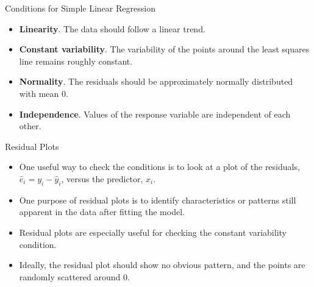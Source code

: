 \documentclass[11pt]{beamer}\usepackage[]{graphicx}\usepackage[]{color}
\begin{document}
\begin{frame}{Conditions for Simple Linear Regression}

\begin{itemize}
\item \textbf{Linearity}.  The data should follow a linear trend.
\vspace{5pt}
\item \textbf{Constant variability}.  The variability of the points around the least squares line remains roughly constant.
\vspace{5pt}
\item \textbf{Normality}.  The residuals should be approximately normally distributed with mean 0.
\vspace{5pt}
\item \textbf{Independence}.  Values of the response variable are independent of each other. 
\end{itemize}
\end{frame}

\begin{frame}{Residual Plots}
\begin{itemize}
\item One useful way to check the conditions is to look at a plot of the residuals, $\hat{e}_i = y_i - \hat{y}_i$, versus the predictor, $x_i$.
\vspace{5pt}
\item One purpose of residual plots is to identify characteristics or patterns still apparent in the data after fitting the model.
\vspace{5pt}
\item Residual plots are especially useful for checking the constant variability condition.
\vspace{5pt}
\item Ideally, the residual plot should show no obvious pattern, and the points are randomly scattered around 0.
\end{itemize}
\end{frame}
\end{document}
